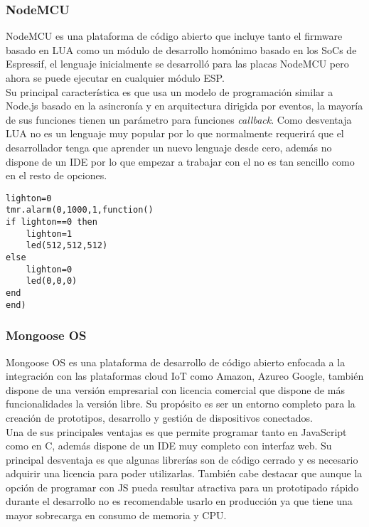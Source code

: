 \documentclass[../proyecto.tex]{subfiles}
\begin{document}
\subsubsection{NodeMCU}
NodeMCU es una plataforma de código abierto que incluye tanto el firmware basado en LUA como un módulo de desarrollo homónimo basado en los SoCs de Espressif, el lenguaje inicialmente se desarrolló para las placas NodeMCU pero ahora se puede ejecutar en cualquier módulo ESP.\\

Su principal característica es que usa un modelo de programación similar a Node.js basado en la  asincronía  y en arquitectura dirigida por eventos, la mayoría de sus funciones tienen un parámetro para funciones \textit{callback}. Como desventaja LUA no es un lenguaje muy popular por lo que normalmente requerirá que el desarrollador tenga que aprender un nuevo lenguaje desde cero, además no dispone de un IDE por lo que empezar a trabajar con el no es tan sencillo como en el resto de opciones.\\

\begin{minipage}{\linewidth}
\begin{lstlisting}[language={[5.0]Lua}, caption=Ejemplo de código para hacer parpadear un led con NodeMCU, captionpos=b, frame=single]
lighton=0
tmr.alarm(0,1000,1,function()
if lighton==0 then
    lighton=1
    led(512,512,512)
else
    lighton=0
    led(0,0,0)
end
end)
\end{lstlisting}
\end{minipage}

\subsubsection{Mongoose OS}
Mongoose OS es una plataforma de desarrollo de código abierto enfocada a la integración con las plataformas cloud IoT como Amazon, Azureo Google, también dispone de una versión empresarial con licencia comercial que dispone de más funcionalidades la versión libre. Su propósito es ser un entorno completo para la creación de prototipos, desarrollo y gestión de dispositivos conectados.\\

Una de sus principales ventajas es que permite programar tanto en JavaScript como en C, además dispone de un IDE muy completo con interfaz web. Su principal desventaja es que algunas librerías son de código cerrado y es necesario adquirir una licencia para poder utilizarlas. También cabe destacar que aunque la opción de programar con JS pueda resultar atractiva para un prototipado rápido durante el desarrollo no es recomendable usarlo en producción ya que tiene una mayor sobrecarga en consumo de memoria y CPU.\\
\end{document}
